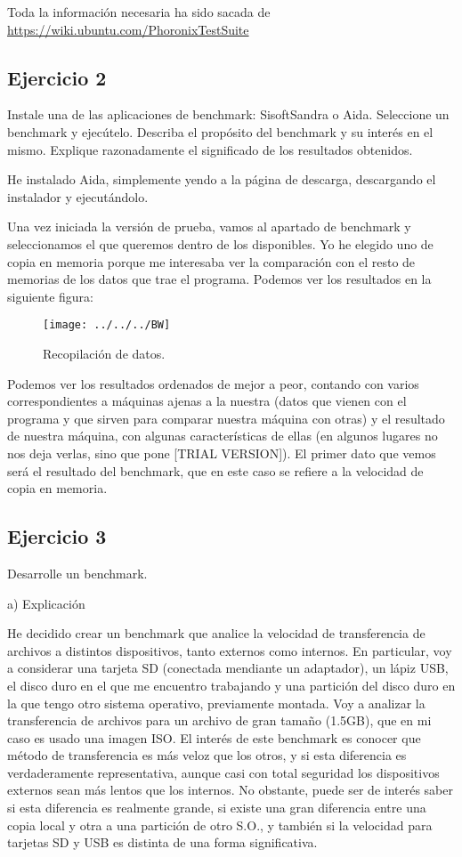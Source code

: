 \documentclass[a4paper, 11pt]{article} %
\begin{document}
Toda la información necesaria ha sido sacada de \url{https://wiki.ubuntu.com/PhoronixTestSuite}

\subsection{Ejercicio 2}
Instale una de las aplicaciones de benchmark: SisoftSandra o Aida. Seleccione un benchmark y ejecútelo. Describa el propósito del benchmark y su interés en el mismo. Explique razonadamente el significado de los resultados obtenidos. 

He instalado Aida, simplemente yendo a la página de descarga, descargando el instalador y ejecutándolo. 
 
Una vez iniciada la versión de prueba, vamos al apartado de benchmark y seleccionamos el que queremos dentro de los disponibles. Yo he elegido uno de copia en memoria porque me interesaba ver la comparación con el resto de memorias de los datos que trae el programa. Podemos ver los resultados en la siguiente figura: 

\begin{figure}[htpb]
\centering
\texttt{[image: ../../../BW]}
\caption{Recopilación de datos.}
\end{figure}

Podemos ver los resultados ordenados de mejor a peor, contando con varios correspondientes a máquinas ajenas a la nuestra (datos que vienen con el programa y que sirven para comparar nuestra máquina con otras) y el resultado de nuestra máquina, con algunas características de ellas (en algunos lugares no nos deja verlas, sino que pone [TRIAL VERSION]). El primer dato que vemos será el resultado del benchmark, que en este caso se refiere a la velocidad de copia en memoria. 

\subsection{Ejercicio 3}
Desarrolle un benchmark. 

a) Explicación

He decidido crear un benchmark que analice la velocidad de transferencia de archivos a distintos dispositivos, tanto externos como internos. En particular, voy a considerar una tarjeta SD (conectada mendiante un adaptador), un lápiz USB, el disco duro en el que me encuentro trabajando y una partición del disco duro en la que tengo otro sistema operativo, previamente montada. Voy a analizar la transferencia de archivos para un archivo de gran tamaño (1.5GB), que en mi caso es usado una imagen ISO. El interés de este benchmark es conocer que método de transferencia es más veloz que los otros, y si esta diferencia es verdaderamente representativa, aunque casi con total seguridad los dispositivos externos sean más lentos que los internos. No obstante, puede ser de interés saber si esta diferencia es realmente grande, si existe una gran diferencia entre una copia local y otra a una partición de otro S.O., y también si la velocidad para tarjetas SD y USB es distinta de una forma significativa. 
\end{document}
